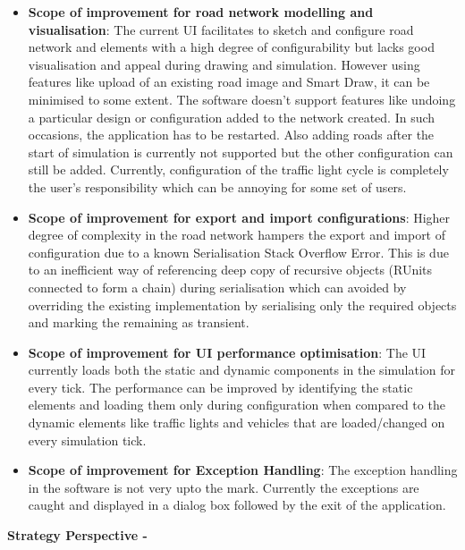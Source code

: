 \documentclass[11pt,a4paper]{article}
\begin{document}
	\begin{itemize}
		\item \textbf{Scope of improvement for road network modelling and visualisation}: The current UI facilitates to sketch and configure road network and elements with a high degree of configurability but lacks good visualisation and appeal during drawing and simulation. However using features like upload of an existing road image and Smart Draw, it can be minimised to some extent. The software doesn’t support features like undoing a particular design or configuration added to the network created. In such occasions, the application has to be restarted. Also adding roads after the start of simulation is currently not supported but the other configuration can still be added. Currently, configuration of the traffic light cycle is completely the user’s responsibility which can be annoying for some set of users. 
		\item \textbf{Scope of improvement for export and import configurations}: Higher degree of complexity in the road network hampers the export and import of configuration due to a known Serialisation Stack Overflow Error. This is due to an inefficient way of referencing deep copy of recursive objects (RUnits connected to form a chain) during serialisation which can avoided by overriding the existing implementation by serialising only the required objects and marking the remaining as transient.
		\item \textbf{Scope of improvement for UI performance optimisation}: The UI currently loads both the static and dynamic components in the simulation for every tick. The performance can be improved by identifying the static elements and loading them only during configuration when compared to the dynamic elements like traffic lights and vehicles that are loaded/changed on every simulation tick.
		\item \textbf{Scope of improvement for Exception Handling}: The exception handling in the software is not very upto the mark. Currently the exceptions are caught and displayed in a dialog box followed by the exit of the application.
	\end{itemize}
	
	
	\textbf{Strategy Perspective -}
	
\end{document}
